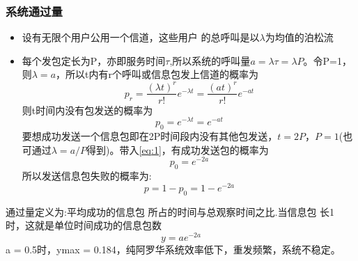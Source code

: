 \subsubsection{系统通过量}
\begin{itemize}
	\item  设有无限个用户公用一个信道，这些用户
	的总呼叫是以$ \lambda $为均值的泊松流
	\item 每个发包定长为P，亦即服务时间$ \tau $,所以系统的呼叫量$ a = \lambda \tau = \lambda P$。令P=1，则$ \lambda = a $，所以t内有r个呼叫或信息包发上信道的概率为
	\begin{equation}\label{key}
	p_r = \frac{(\lambda t)^r}{r!}e^{-\lambda t} = \frac{(a t)^r}{r!}e^{-a t}
	\end{equation}
	则t时间内没有包发送的概率为
	\begin{equation}\label{eq:1}
	p_0 = e^{-\lambda t} = e^{-at}
	\end{equation}
	要想成功发送一个信息包即在2P时间段内没有其他包发送，$ t = 2P，P = 1 $(也可通过$ \lambda = a/P$得到)。带入\ref{eq:1}，有成功发送包的概率为
	\begin{equation}\label{key}
	p_0 = e^{-2a}
	\end{equation}
	所以发送信息包失败的概率为:
	\begin{equation}\label{key}
	p = 1-p_0 = 1- e^{-2a}
	\end{equation}
\end{itemize}
通过量定义为:平均成功的信息包
所占的时间与总观察时间之比.当信息包
长1 时，这就是单位时间成功的信息包数
\begin{equation}\label{key}
y = ae^{-2a}
\end{equation}
a = 0.5时，ymax = 0.184，纯阿罗华系统效率低下，重发频繁，系统不稳定。
